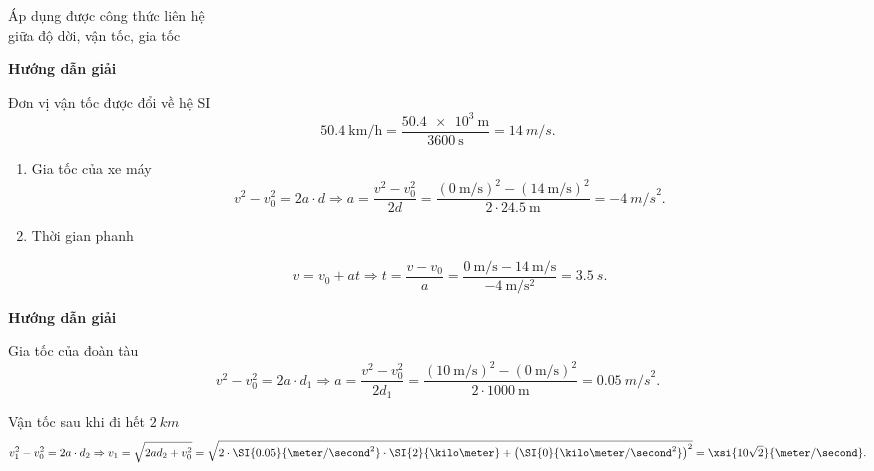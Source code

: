 \begin{dang}{Áp dụng được công thức liên hệ \\giữa độ dời, vận tốc, gia tốc }
	{	\begin{center}
			\textbf{Hướng dẫn giải}
		\end{center}
		
		Đơn vị vận tốc được đổi về hệ SI $$\SI{50,4}{\kilo\meter/\hour} =\dfrac{\SI{50.4e3}{\meter}}{\SI{3600}{\second}}= \SI{14}{m/s}.$$
		\begin{enumerate}[label=\alph*.]
			\item Gia tốc của xe máy
			$$v^2-v_0^2 =2a\cdot d \Rightarrow a =\dfrac{v^2 - v_0^2}{2d}=\dfrac{\left(\SI{0}{\meter/\second}\right)^{2}-\left(\SI{14}{\meter/\second}\right)^{2}}{2\cdot\SI{24.5}{\meter}}=\SI{-4}{m/s}^2.$$
			\item Thời gian phanh
			
			$$v =v_0 +at \Rightarrow t = \dfrac{v-v_0}{a} =\dfrac{\SI{0}{\meter/\second}-\SI{14}{\meter/\second}}{\SI{-4}{\meter/\second^{2}}}= \SI{3,5}{s}.$$
		\end{enumerate}
	}
	{	\begin{center}
			\textbf{Hướng dẫn giải}
		\end{center}
		
		Gia tốc của đoàn tàu
		$$v^2-v_0^2 =2a\cdot d_1 \Rightarrow a = \dfrac{v^2-v_0^2}{2d_1}=\dfrac{\left(\SI{10}{\meter/\second}\right)^2-(\SI{0}{\meter/\second})^2}{2\cdot\SI{1000}{\meter}} =\SI{0,05}{m/s}^2.$$
		
		Vận tốc sau khi đi hết $\SI{2}{km}$
		$$v_1^2 - v_0^2 = 2a\cdot d_2 \Rightarrow  v_1 =\sqrt{2ad_2+v_0^2}=\sqrt{2\cdot\SI{0.05}{\meter/\second^{2}}\cdot\SI{2}{\kilo\meter}+\left(\SI{0}{\kilo\meter/\second^{2}}\right)^{2}} =\xsi{10\sqrt{2}}{\meter/\second}.$$
	}
\end{dang}
